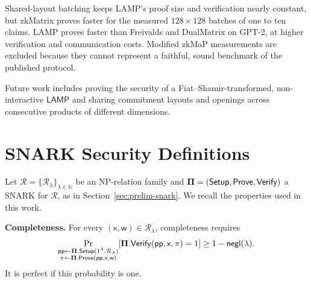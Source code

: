 \documentclass[conference,compsoc]{IEEEtran}
\makeatletter
\newif\ifshowrevisions
\newenvironment{revblock}[1][]
  {%
    \ifshowrevisions
      \begin{tcolorbox}[
        breakable,
        colback=revisionyellow,
        colframe=revisionyellow,
        boxrule=0pt,
        arc=0pt,
        left=2pt,
        right=2pt,
        top=2pt,
        bottom=2pt,
        before skip=2pt,
        after skip=2pt,
        #1
      ]
    \fi
  }
  {%
    \ifshowrevisions
      \end{tcolorbox}
    \fi
  }
\newcommand{\para}{\textsf{pp}}
\newcommand{\bPi}{{\bf \Pi}}
\newcommand{\setup}{{\sf Setup}}
\newcommand{\prove}{{\sf Prove}}
\renewcommand{\verify}{{\sf Verify}}
\newcommand{\relation}{{\mathcal{R}}}
\newcommand{\stmt}{\mathsf{x}}      %
\newcommand{\wit}{\mathsf{w}}       %
\newcommand{\protocol}{\textsf{LAMP}}   %
\theoremstyle{plain}
\theoremstyle{definition}
\theoremstyle{remark}
\providecommand{\DIFaddtex}[1]{{\protect\color{blue}\uwave{#1}}} %
\providecommand{\DIFdeltex}[1]{{\protect\color{red}\sout{#1}}} %
\providecommand{\DIFaddbegin}{} %
\providecommand{\DIFaddend}{} %
\providecommand{\DIFdelbegin}{} %
\providecommand{\DIFdelend}{} %
\providecommand{\DIFadd}[1]{\texorpdfstring{\DIFaddtex{#1}}{#1}} %
\providecommand{\DIFdel}[1]{\texorpdfstring{\DIFdeltex{#1}}{}} %
\let\sout@orig\sout %
\renewcommand{\sout}[1]{\ifmmode\text{\sout@orig{\ensuremath{#1}}}\else\sout@orig{#1}\fi} %
\renewcommand{\DIFaddtex}[1]{{\protect\color{DiffBlue}#1}}
\renewcommand{\DIFdeltex}[1]{}
\makeatother
\begin{document}
  \begin{revblock}
  \DIFdelbegin \DIFdel{For claims sharing a leaf structure, batching amortizes Merkle openings and
  keeps their }\DIFdelend \DIFaddbegin \DIFadd{Shared-layout batching keeps LAMP's }\DIFaddend proof size and verification \DIFdelbegin \DIFdel{time nearly
  constant. On }\DIFdelend \DIFaddbegin \DIFadd{nearly
  constant, but zkMatrix proves faster for the measured \(128\times128\)
  batches of one to ten claims. LAMP proves faster than Freivalds and
  DualMatrix on }\DIFaddend GPT-2, \DIFdelbegin \DIFdel{\(\protocol\) proves faster than both baselines, although heterogeneous matrix
  dimensions require multiple commitment layouts, CP-Link proofs, and
  Merkle
  openings, increasing proof size and verification cost.
  }\DIFdelend \DIFaddbegin \DIFadd{at higher verification and communication costs.
  Modified zkMaP measurements are excluded because they cannot represent
  a faithful, sound benchmark of the published protocol.
  }\DIFaddend \end{revblock}

  \begin{revblock}
  Future work includes proving the security of a Fiat--Shamir-transformed,
  non-interactive \(\protocol\) and sharing commitment layouts and openings across
  consecutive products of different dimensions.
  \DIFdelbegin \DIFdel{These improvements should reduce
  proof size and verification cost for verifiable AI while preserving linear
  constraint complexity.
  }\DIFdelend \end{revblock}






\appendices

\section{SNARK Security Definitions}
\label{app:snark-security}

Let \(\relation=\{\relation_\lambda\}_{\lambda\in\mathbb{N}}\) be an NP-relation
family and \(\bPi=(\setup,\prove,\verify)\) a SNARK for \(\relation\), as in
Section~\ref{sec:prelim-snark}.  We recall the properties used in this work.

\noindent\textbf{Completeness.}
For every \((\stmt,\wit)\in\relation_\lambda\), completeness requires
\[
\Pr_{\substack{
  \para\gets\bPi.\setup(1^\lambda,\relation_\lambda)\\
  \pi\gets\bPi.\prove(\para,\stmt,\wit)}}
\!\left[\bPi.\verify(\para,\stmt,\pi)=1\right]
\ge 1-\textsf{negl}(\lambda).
\]
It is perfect if this probability is one.
\end{document}
